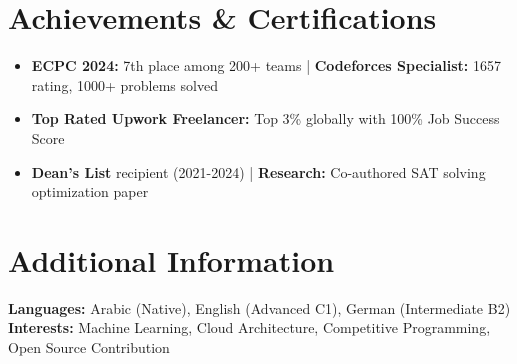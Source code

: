 \documentclass[8pt,a4paper]{article}
\newcommand{\skillsection}[2]{%
    \textbf{#1:} #2\\[-0.02em]
}
\begin{document}

\section{Achievements \& Certifications}

\begin{itemize}
    \item \textbf{ECPC 2024:} 7th place among 200+ teams | \textbf{Codeforces Specialist:} 1657 rating, 1000+ problems solved
    \item \textbf{Top Rated Upwork Freelancer:} Top 3\% globally with 100\% Job Success Score
    \item \textbf{Dean's List} recipient (2021-2024) | \textbf{Research:} Co-authored SAT solving optimization paper
\end{itemize}


\section{Additional Information}

\skillsection{Languages}{Arabic (Native), English (Advanced C1), German (Intermediate B2)}
\skillsection{Interests}{Machine Learning, Cloud Architecture, Competitive Programming, Open Source Contribution}
\end{document}

